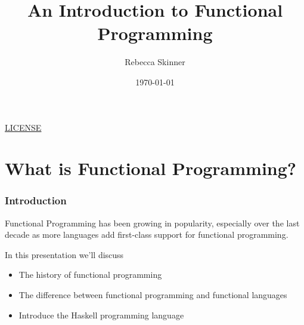 \documentclass{beamer}
\title{An Introduction to Functional Programming}
\author{Rebecca Skinner}
\date{\today}
\newcommand{\chref}[3] {
  {\color{#1} \href{#2}{\underline{#3}}}
}
\begin{document}
\begin{frame}
  \titlepage{}
  \begin{center}
    \small{\chref{blue}{http://creativecommons.org/licenses/by-sa/4.0/}{LICENSE}}
  \end{center}
\end{frame}

\section{What is Functional Programming?}

\begin{frame}
  \frametitle{Introduction}
  Functional Programming has been growing in popularity, especially
  over the last decade as more languages add first-class support for
  functional programming.

  In this presentation we'll discuss
  \pause
  \begin{itemize}
  \item The history of functional programming
  \item The difference between functional programming and functional languages
  \item Introduce the Haskell programming language
  \end{itemize}
\end{frame}
\end{document}
